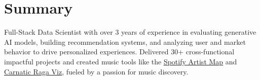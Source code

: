 \documentclass[letterpaper,11pt]{article}
\begin{document}
\section{\large{Summary}}
\vspace{3pt}
{\small{



Full-Stack Data Scientist with over 3 years of experience in evaluating generative AI models, building recommendation systems, and analyzing user and market behavior to drive personalized experiences. Delivered 30+ cross-functional impactful projects and created music tools like the \href{https://vishugp.github.io/MusicMandala}{\underline{Spotify Artist Map}} and \href{https://carnatic.vishguru.com}{\underline{Carnatic Raga Viz}}, fueled by a passion for music discovery.




}}

\end{document}
